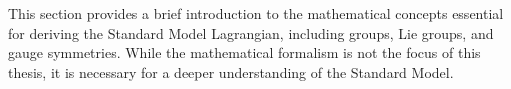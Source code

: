 This section provides a brief introduction to the mathematical concepts essential for deriving the Standard Model Lagrangian, including groups, Lie groups, and gauge symmetries. While the mathematical formalism is not the focus of this thesis, it is necessary for a deeper understanding of the Standard Model.